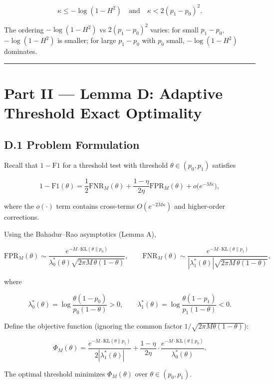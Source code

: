 \documentclass[
  12pt,
]{article}
\begin{document}
\[
\kappa \leq -\log(1-H^2) \quad\text{and}\quad \kappa < 2(p_1-p_0)^2.
\]

The ordering \(-\log(1-H^2)\) vs \(2(p_1-p_0)^2\) varies: for small
\(p_1-p_0\), \(-\log(1-H^2)\) is smaller; for large \(p_1-p_0\) with
\(p_0\) small, \(-\log(1-H^2)\) dominates.

\begin{center}\rule{0.5\linewidth}{0.5pt}\end{center}

\section{Part II --- Lemma D: Adaptive Threshold Exact
Optimality}\label{part-ii-lemma-d-adaptive-threshold-exact-optimality}

\subsection{D.1 Problem Formulation}\label{d.1-problem-formulation}

Recall that \(1 - \text{F1}\) for a threshold test with threshold
\(\theta \in (p_0, p_1)\) satisfies

\[
1 - \text{F1}(\theta) = \frac{1}{2}\text{FNR}_M(\theta) + \frac{1-\eta}{2\eta}\text{FPR}_M(\theta) + o\bigl(e^{-M\kappa}\bigr),
\]

where the \(o(\cdot)\) term contains cross-terms \(O(e^{-2M\kappa})\)
and higher-order corrections.

Using the Bahadur--Rao asymptotics (Lemma A),

\[
\text{FPR}_M(\theta) \sim \frac{e^{-M\cdot\text{KL}(\theta\|p_0)}}{\lambda_0^*(\theta)\sqrt{2\pi M\,\theta(1-\theta)}},
\qquad
\text{FNR}_M(\theta) \sim \frac{e^{-M\cdot\text{KL}(\theta\|p_1)}}{|\lambda_1^*(\theta)|\sqrt{2\pi M\,\theta(1-\theta)}},
\]

where

\[
\lambda_0^*(\theta) = \log\frac{\theta(1-p_0)}{p_0(1-\theta)} > 0,\qquad
\lambda_1^*(\theta) = \log\frac{\theta(1-p_1)}{p_1(1-\theta)} < 0.
\]

Define the objective function (ignoring the common factor
\(1/\sqrt{2\pi M\theta(1-\theta)}\)):

\[
\Phi_M(\theta) = \frac{e^{-M\cdot\text{KL}(\theta\|p_1)}}{2|\lambda_1^*(\theta)|} + \frac{1-\eta}{2\eta}\cdot\frac{e^{-M\cdot\text{KL}(\theta\|p_0)}}{\lambda_0^*(\theta)}. \tag{D.1}
\]

The optimal threshold minimizes \(\Phi_M(\theta)\) over
\(\theta \in (p_0, p_1)\).
\end{document}
